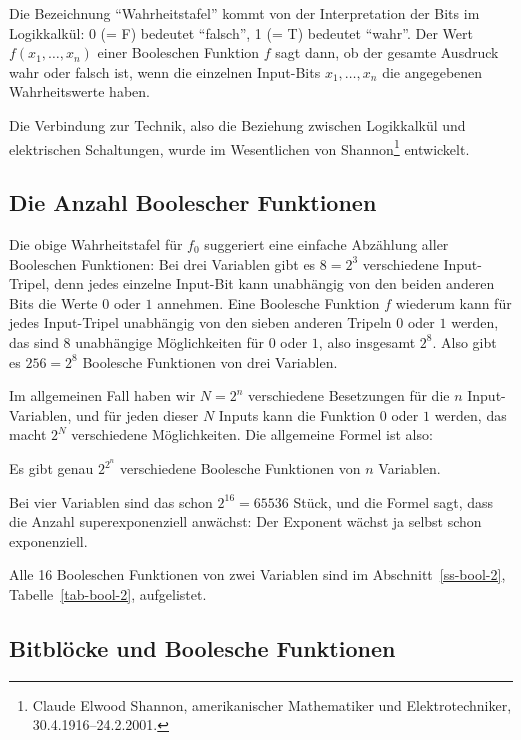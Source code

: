 \begin{refsegment}
Die Bezeichnung "`Wahrheitstafel"' kommt von der Interpretation der
Bits im Logikkalkül: 0 (= F) bedeutet "`falsch"', 1 (= T) bedeutet "`wahr"'.
Der Wert $f(x_1,\ldots,x_n)$ einer Booleschen Funktion $f$ sagt dann,
ob der gesamte Ausdruck wahr oder falsch ist, wenn die einzelnen Input-Bits
$x_1,\ldots,x_n$ die angegebenen Wahrheitswerte haben.

Die Verbindung zur Technik, also die Beziehung zwischen Logikkalkül
und elektrischen Schaltungen, wurde im Wesentlichen von
Shannon\footnote{%
  Claude Elwood Shannon, amerikanischer Mathematiker und Elektrotechniker,
  30.4.1916--24.2.2001.
}
entwickelt.

\subsection{Die Anzahl Boolescher Funktionen}\label{ss-bool-enum}

Die obige Wahrheitstafel für $f_0$ suggeriert eine einfache Abzählung aller
Booleschen Funktionen:
Bei drei Variablen gibt es $8 = 2^3$ verschiedene Input-Tripel, denn jedes
einzelne Input-Bit kann unabhängig von den beiden anderen Bits die Werte $0$ oder $1$
annehmen. Eine Boolesche Funktion $f$ wiederum kann für jedes Input-Tripel
unabhängig von den sieben anderen Tripeln $0$ oder $1$ werden, das
sind $8$ unabhängige Möglichkeiten für $0$ oder $1$, also insgesamt $2^8$.
Also gibt es $256 = 2^8$ Boolesche Funktionen von drei Variablen.

Im allgemeinen Fall haben wir $N = 2^n$ verschiedene Besetzungen für
die $n$ Input-Variablen, und für jeden dieser $N$ Inputs kann die
Funktion $0$ oder $1$ werden, das macht $2^N$ verschiedene
Möglichkeiten. Die allgemeine Formel ist also:

\begin{satz}\label{thm-bool-enum}
   Es gibt genau $2^{2^n}$ verschiedene Boolesche Funktionen von
   $n$ Variablen.
\end{satz}

Bei vier Variablen sind das schon $2^{16} = 65536$ Stück, und die Formel
sagt, dass die Anzahl superexponenziell anwächst: Der Exponent wächst
ja selbst schon exponenziell.

Alle 16 Booleschen Funktionen von zwei Variablen sind im
Abschnitt~\ref{ss-bool-2}, Tabelle~\ref{tab-bool-2}, aufgelistet.

\subsection{Bitblöcke und Boolesche Funktionen}\label{ss-bool-blck}


\end{refsegment}
